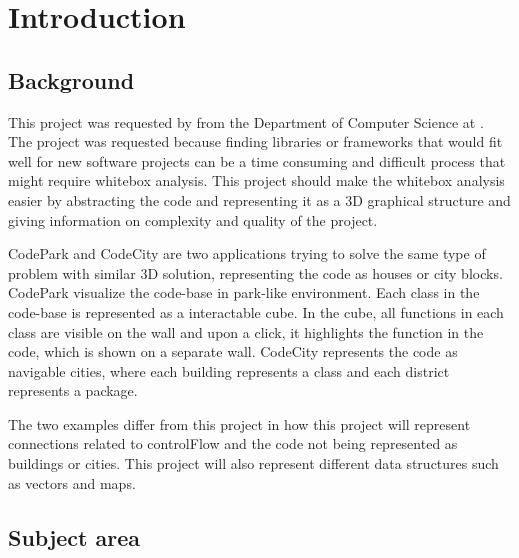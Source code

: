 \chapter{Introduction}
\label{chap:introduction}

\section{Background}
This project was requested by \productowner{} from the Department of Computer Science at \NTNUgjovik. The project was requested because finding libraries or frameworks that would fit well for new software projects can be a time consuming and difficult process that might require \gls{whitebox} analysis. This project should make the \gls{whitebox} analysis easier by abstracting the code and representing it as a 3D graphical structure and giving information on complexity and quality of the project. 

CodePark \cite{DBLP:journals/corr/abs-1708-02174} and CodeCity \cite{wettel2010software} are two applications trying to solve the same type of problem with similar 3D solution, representing the code as houses or city blocks. CodePark visualize the code-base in park-like environment. Each class in the code-base is represented as a interactable cube. In the cube, all functions in each class are visible on the wall and upon a click, it highlights the function in the code, which is shown on a separate wall. CodeCity represents the code as navigable cities, where each building represents a class and each district represents a package.

The two examples differ from this project in how this project will represent connections related to \gls{controlFlow} and the code not being represented as buildings or cities. This project will also represent different data structures such as vectors and maps.

\section{Subject area}


